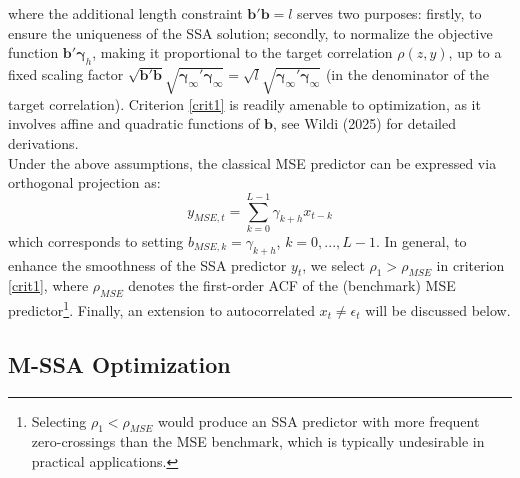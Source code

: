 \documentclass[11pt,a4paper]{article}
\begin{document}
where the additional length constraint $\mathbf{b}'\mathbf{b}=l$ serves two purposes: firstly, to ensure the uniqueness of the SSA solution; secondly, to normalize the objective function $\mathbf{b}'\boldsymbol{\gamma}_{h}$, making it proportional to the target correlation $\rho(z,y)$, up to a fixed scaling factor $\sqrt{\mathbf{b}'\mathbf{b}}\sqrt{\boldsymbol{\gamma}_{\infty}'\boldsymbol{\gamma}_{\infty}}=\sqrt{l}\sqrt{\boldsymbol{\gamma}_{\infty}'\boldsymbol{\gamma}_{\infty}}$ (in the denominator of the target correlation). Criterion \eqref{crit1} is readily amenable to optimization, as it involves affine and quadratic functions of $\mathbf{b}$, see Wildi (2025) for detailed derivations. \\
Under the above assumptions, the classical MSE predictor can be expressed via orthogonal projection as:
\[
y_{MSE,t}=\sum_{k=0}^{L-1}\gamma_{k+h}x_{t-k}
\]
which corresponds to setting $b_{MSE,k}=\gamma_{k+h}$, $k=0,...,L-1$. In general, to enhance the smoothness of the SSA predictor $y_t$, we select $\rho_1>\rho_{MSE}$ in criterion \eqref{crit1},  where $\rho_{MSE}$ denotes the first-order ACF of the (benchmark) MSE predictor\footnote{Selecting $\rho_1<\rho_{MSE}$ would produce an SSA predictor with more frequent zero-crossings than the MSE benchmark, which is typically undesirable in practical applications.}. Finally,  an extension to autocorrelated $x_t\neq \epsilon_t$ will be discussed below.
 




\subsection{M-SSA Optimization}
\end{document}
